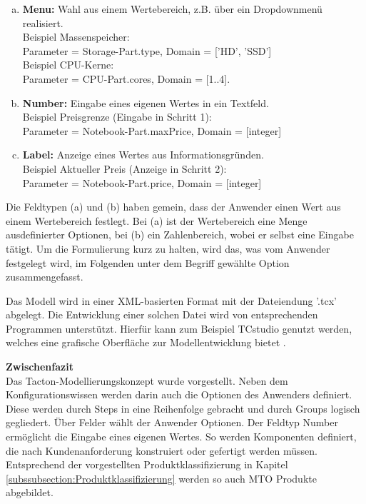 \documentclass[12pt,a4paper,bibliography=totocnumbered,listof=totoc]{scrartcl}
\begin{document}
\begin{compactitem}
\begin{enumerate}[(a)]
\item \textbf{Menu:} Wahl aus einem Wertebereich, z.B. über ein Dropdownmenü realisiert.\\
Beispiel Massenspeicher:\\
Parameter = Storage-Part.type,  Domain = ['HD', 'SSD']\\
Beispiel CPU-Kerne:\\
Parameter = CPU-Part.cores, Domain = [1..4].
\item \textbf{Number:} Eingabe eines eigenen Wertes in ein Textfeld.\\
Beispiel Preisgrenze (Eingabe in Schritt 1):\\
 Parameter = Notebook-Part.maxPrice, Domain = [integer]
\item \textbf{Label:} Anzeige eines Wertes aus Informationsgründen.\\
Beispiel Aktueller Preis (Anzeige in Schritt 2):\\
Parameter = Notebook-Part.price, Domain = [integer]
\end{enumerate}
\end{compactitem}

Die Feldtypen (a) und (b) haben gemein, dass der Anwender einen Wert aus einem Wertebereich festlegt. Bei (a) ist der Wertebereich eine Menge ausdefinierter Optionen, bei (b) ein Zahlenbereich, wobei er selbst eine Eingabe tätigt. Um die Formulierung kurz zu halten, wird das, was vom Anwender festgelegt wird, im Folgenden unter dem Begriff \glqq gewählte Option\grqq{} zusammengefasst.

Das Modell wird in einer XML-basierten Format mit der Dateiendung '.tcx' abgelegt. Die Entwicklung einer solchen Datei wird von entsprechenden Programmen unterstützt. Hierfür kann zum Beispiel \glqq TCstudio\grqq{} genutzt werden, welches eine grafische Oberfläche zur Modellentwicklung bietet \citep{tactonAbout}.

\textbf{Zwischenfazit}\\
Das Tacton-Modellierungskonzept wurde vorgestellt. Neben dem Konfigurationswissen werden darin auch die Optionen des Anwenders definiert. Diese werden durch Steps in eine Reihenfolge gebracht und durch Groups logisch gegliedert. Über Felder wählt der Anwender Optionen. Der Feldtyp Number ermöglicht die Eingabe eines eigenen Wertes. So werden Komponenten definiert, die nach Kundenanforderung konstruiert oder gefertigt werden müssen. Entsprechend der vorgestellten Produktklassifizierung in Kapitel \ref{subssubsection:Produktklassifizierung} werden so auch \ac{MTO} Produkte abgebildet.
\end{document}
